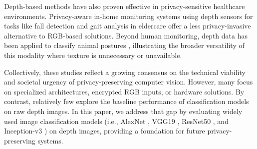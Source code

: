 Depth-based methods have also proven effective in privacy-sensitive healthcare environments. Privacy-aware in-home monitoring systems using depth sensors for tasks like fall detection and gait analysis in eldercare \cite{InHomeMonitoringDepthSensors} offer a less privacy-invasive alternative to RGB-based solutions. Beyond human monitoring, depth data has been applied to classify animal postures \cite{SowPostureClassification}, illustrating the broader versatility of this modality where texture is unnecessary or unavailable.

Collectively, these studies reflect a growing consensus on the technical viability and societal urgency of privacy-preserving computer vision. However, many focus on specialized architectures, encrypted RGB inputs, or hardware solutions. By contrast, relatively few explore the baseline performance of classification models on raw depth images. In this paper, we address that gap by evaluating widely used image classification models (i.e., AlexNet \cite{alexnet}, VGG19 \cite{vgg19}, ResNet50 \cite{resnet50}, and Inception-v3 \cite{inceptionv3}) on depth images, providing a foundation for future privacy-preserving systems.
